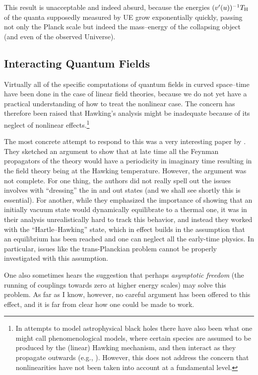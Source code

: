\documentclass[12pt]{article}
\begin{document}
This result is unacceptable and indeed absurd, because the energies $(v'(u))^{-1}T_{\rm H}$ of the quanta supposedly measured by UE grow exponentially quickly, passing not only the Planck scale but indeed the mass--energy of the collapsing object (and even of the observed Universe).


\subsection{Interacting Quantum Fields}

Virtually all of the specific computations of quantum fields in curved space--time have been done in the case of linear field theories, because we do not yet have a practical understanding of how to treat the nonlinear case.  The concern has therefore been raised that Hawking's analysis might be inadequate because of its neglect of nonlinear effects.\footnote{In attempts to model astrophysical black holes there have also been what one might call phenomenological models, where certain species are assumed to be produced by the (linear) Hawking mechanism, and then interact as they propagate outwards (e.g.,  \citep{MacGibbon:1990zk}).  However, this does not address the concern that nonlinearities have not been taken into account at a fundamental level.}

The most concrete attempt to respond to this was a very interesting paper by \citet{Gibbons:1976es}.  They sketched an argument to show that at late time all the Feynman propagators of the theory would have  a periodicity in imaginary time resulting in the field theory being at the Hawking temperature.  However, the argument was not complete.  For one thing, the authors did not really spell out the issues involves with ``dressing'' the in and out states (and we shall see shortly this is essential).  For another, while they emphasized the importance of showing that an initially vacuum state would dynamically equilibrate to a thermal one, it was in their analysis unrealistically hard to track this behavior, and instead they worked with the ``Hartle--Hawking'' state, which in effect builds in the assumption that an equilibrium has been reached and one can neglect all the early-time physics.  In particular, issues like the trans-Planckian problem cannot be properly investigated with this assumption.

One also sometimes hears the suggestion that perhaps {\em asymptotic freedom} (the running of couplings towards zero at higher energy scales) may solve this problem.  As far as I know, however, no careful argument has been offered to this effect, and it is far from clear how one could be made to work.
\end{document}
